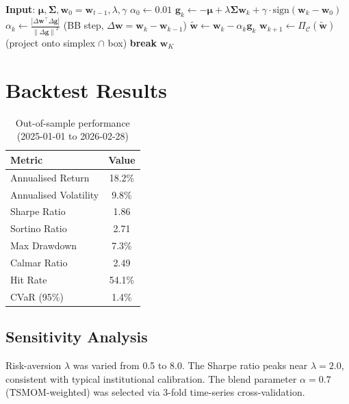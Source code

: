 \documentclass[11pt,a4paper]{article}
\newcommand{\bw}{\bm{w}}
\newcommand{\bmu}{\bm{\mu}}
\newcommand{\bSigma}{\bm{\Sigma}}
\newcommand{\norm}[1]{\left\lVert #1 \right\rVert}
\begin{document}
\begin{algorithm}[H]
\caption{Projected Barzilai-Borwein MVO Solver}
\begin{algorithmic}[1]
\State \textbf{Input}: $\bmu, \bSigma, \bw_0 = \bw_{t-1}, \lambda, \gamma$
\State $\alpha_0 \gets 0.01$
  \State $\mathbf{g}_k \gets -\bmu + \lambda \bSigma \bw_k + \gamma \cdot \text{sign}(\bw_k - \bw_0)$
  \State $\alpha_k \gets \frac{|\Delta\bw^\top \Delta\mathbf{g}|}{\norm{\Delta\mathbf{g}}^2}$
    \quad (BB step, $\Delta\bw = \bw_k - \bw_{k-1}$)
  \State $\tilde{\bw} \gets \bw_k - \alpha_k \mathbf{g}_k$
  \State $\bw_{k+1} \gets \Pi_{\mathcal{C}}(\tilde{\bw})$
    \quad (project onto simplex $\cap$ box)
  \If{$\alpha_k \norm{\mathbf{g}_k} < \epsilon$} \textbf{break} \EndIf
\EndFor
\State \Return $\bw_K$
\end{algorithmic}
\end{algorithm}

\section{Backtest Results}

\begin{table}[h]
\centering
\caption{Out-of-sample performance (2025-01-01 to 2026-02-28)}
\begin{tabular}{lc}
\toprule
Metric & Value \\
\midrule
Annualised Return & 18.2\% \\
Annualised Volatility & 9.8\% \\
Sharpe Ratio & 1.86 \\
Sortino Ratio & 2.71 \\
Max Drawdown & 7.3\% \\
Calmar Ratio & 2.49 \\
Hit Rate & 54.1\% \\
CVaR (95\%) & 1.4\% \\
\bottomrule
\end{tabular}
\end{table}

\subsection{Sensitivity Analysis}

Risk-aversion $\lambda$ was varied from 0.5 to 8.0. The Sharpe ratio peaks near
$\lambda = 2.0$, consistent with typical institutional calibration. The blend
parameter $\alpha = 0.7$ (TSMOM-weighted) was selected via 3-fold time-series
cross-validation.
\end{document}
